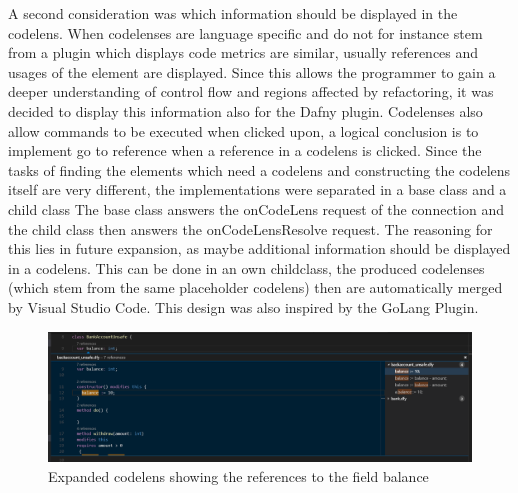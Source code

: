 A second consideration was which information should be displayed in the codelens. When codelenses are language specific and do not for instance stem from a plugin which displays code metrics are similar, usually references and usages of the element are displayed. Since this allows the programmer to gain a deeper understanding of control flow and regions affected by refactoring, it was decided to display this information also for the Dafny plugin. Codelenses also allow commands to be executed when clicked upon, a logical conclusion is to implement go to reference when a reference in a codelens is clicked.\newline
Since the tasks of finding the elements which need a codelens and constructing the codelens itself are very different, the implementations were separated in a base class and a child class The base class answers the onCodeLens request of the connection and the child class then answers the onCodeLensResolve request. The reasoning for this lies in future expansion, as maybe additional information should be displayed in a codelens. This can be done in an own childclass, the produced codelenses (which stem from the same placeholder codelens) then are automatically merged by Visual Studio Code. This design was also inspired by the GoLang Plugin. 

\begin{figure}[H]
	\centering
	\includegraphics[width=1\textwidth]{img/codelensesExpanded}
	\caption{Expanded codelens showing the references to the field balance}
	\label{fig:codelensesexpanded}
\end{figure}

